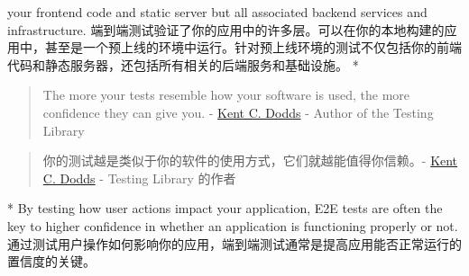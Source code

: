 \begin{paracol}{2}
your frontend code and static server but all associated backend services
and infrastructure.
\switchcolumn
端到端测试验证了你的应用中的许多层。可以在你的本地构建的应用中，甚至是一个预上线的环境中运行。针对预上线环境的测试不仅包括你的前端代码和静态服务器，还包括所有相关的后端服务和基础设施。
\switchcolumn[0]*%
\begin{quote}
The more your tests resemble how your software is used, the more
confidence they can give you. -
\href{https://twitter.com/kentcdodds/status/977018512689455106}{Kent C.
Dodds} - Author of the Testing Library
\end{quote}
\switchcolumn
\begin{quote}
你的测试越是类似于你的软件的使用方式，它们就越能值得你信赖。-
\href{https://twitter.com/kentcdodds/status/977018512689455106}{Kent C.
Dodds} - Testing Library 的作者
\end{quote}
\switchcolumn[0]*%
By testing how user actions impact your application, E2E tests are often
the key to higher confidence in whether an application is functioning
properly or not.
\switchcolumn
通过测试用户操作如何影响你的应用，端到端测试通常是提高应用能否正常运行的置信度的关键。
\end{paracol}


